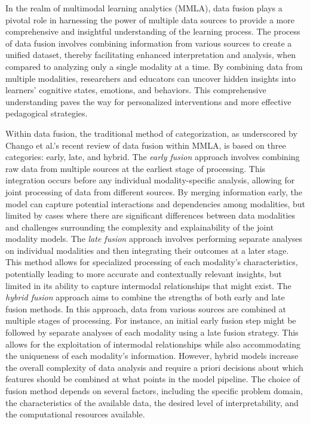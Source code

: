 \documentclass[manuscript,screen,review]{acmart}
\begin{document}
In the realm of multimodal learning analytics (MMLA), data fusion plays a pivotal role in harnessing the power of multiple data sources to provide a more comprehensive and insightful understanding of the learning process. The process of data fusion involves combining information from various sources to create a unified dataset, thereby facilitating enhanced interpretation and analysis, when compared to analyzing only a single modality at a time. By combining data from multiple modalities, researchers and educators can uncover hidden insights into learners' cognitive states, emotions, and behaviors. This comprehensive understanding paves the way for personalized interventions and more effective pedagogical strategies. 

Within data fusion, the traditional method of categorization, as underscored by Chango et al.’s \cite{Chango2022} recent review of data fusion within MMLA, is based on three categories: early, late, and hybrid. The \textit{early fusion} approach involves combining raw data from multiple sources at the earliest stage of processing. This integration occurs before any individual modality-specific analysis, allowing for joint processing of data from different sources. By merging information early, the model can capture potential interactions and dependencies among modalities, but limited by cases where there are significant differences between data modalities and challenges surrounding the complexity and explainability of the joint modality models. The \textit{late fusion} approach involves performing separate analyses on individual modalities and then integrating their outcomes at a later stage. This method allows for specialized processing of each modality's characteristics, potentially leading to more accurate and contextually relevant insights, but limited in its ability to capture intermodal relationships that might exist. The \textit{hybrid fusion} approach aims to combine the strengths of both early and late fusion methods. In this approach, data from various sources are combined at multiple stages of processing. For instance, an initial early fusion step might be followed by separate analyses of each modality using a late fusion strategy. This allows for the exploitation of intermodal relationships while also accommodating the uniqueness of each modality's information. However, hybrid models increase the overall complexity of data analysis and require a priori decisions about which features should be combined at what points in the model pipeline. The choice of fusion method depends on several factors, including the specific problem domain, the characteristics of the available data, the desired level of interpretability, and the computational resources available.
\end{document}
